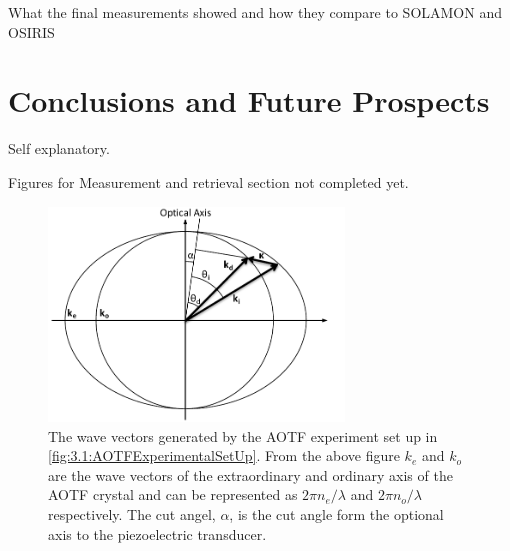 \documentclass[12pt]{article}
\begin{document}
What the final measurements showed and how they compare to SOLAMON and OSIRIS

\section{Conclusions and Future Prospects}

Self explanatory.

Figures for Measurement and retrieval section not completed yet.

\newpage

 

\newpage

\begin{figure}[h!]
    \begin{center}
    \includegraphics[width=0.7\textwidth]{./Images/3-1-AOTFWavevectorWithRefraction.pdf}
    \caption[Wave Vectors Generated by an AOTF]{The wave vectors generated by the AOTF experiment set up in \autoref{fig:3.1:AOTFExperimentalSetUp}. From the above figure $k_{e}$ and $k_{o}$ are the wave vectors of the extraordinary and ordinary axis of the AOTF crystal and can be represented as $2\pi n_{e}/\lambda$ and $2\pi n_{o}/\lambda$ respectively. The cut angel, $\alpha$, is the cut angle form the optional axis to the piezoelectric transducer.}
    \label{fig:3.1:ATOFWavevectors}
    \end{center}
\end{figure}
\end{document}
